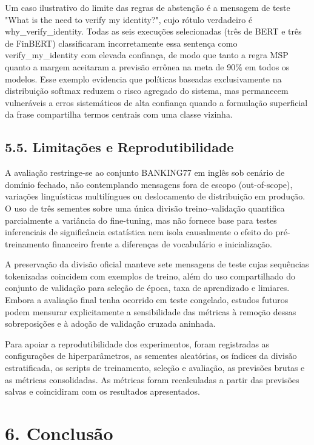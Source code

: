 \documentclass[12pt,a4paper]{article}
\begin{document}
Um caso ilustrativo do limite das regras de abstenção é a mensagem de teste "What is the need to verify my identity?", cujo rótulo verdadeiro é why\_verify\_identity. Todas as seis execuções selecionadas (três de BERT e três de FinBERT) classificaram incorretamente essa sentença como verify\_my\_identity com elevada confiança, de modo que tanto a regra MSP quanto a margem aceitaram a previsão errônea na meta de 90\% em todos os modelos. Esse exemplo evidencia que políticas baseadas exclusivamente na distribuição softmax reduzem o risco agregado do sistema, mas permanecem vulneráveis a erros sistemáticos de alta confiança quando a formulação superficial da frase compartilha termos centrais com uma classe vizinha.

\subsection*{\textbf{5.5. Limitações e Reprodutibilidade}}

A avaliação restringe-se ao conjunto BANKING77 em inglês sob cenário de domínio fechado, não contemplando mensagens fora de escopo (out-of-scope), variações linguísticas multilíngues ou deslocamento de distribuição em produção. O uso de três sementes sobre uma única divisão treino–validação quantifica parcialmente a variância do fine-tuning, mas não fornece base para testes inferenciais de significância estatística nem isola causalmente o efeito do pré-treinamento financeiro frente a diferenças de vocabulário e inicialização.

A preservação da divisão oficial manteve sete mensagens de teste cujas sequências tokenizadas coincidem com exemplos de treino, além do uso compartilhado do conjunto de validação para seleção de época, taxa de aprendizado e limiares. Embora a avaliação final tenha ocorrido em teste congelado, estudos futuros podem mensurar explicitamente a sensibilidade das métricas à remoção dessas sobreposições e à adoção de validação cruzada aninhada.

Para apoiar a reprodutibilidade dos experimentos, foram registradas as configurações de hiperparâmetros, as sementes aleatórias, os índices da divisão estratificada, os scripts de treinamento, seleção e avaliação, as previsões brutas e as métricas consolidadas. As métricas foram recalculadas a partir das previsões salvas e coincidiram com os resultados apresentados.

\section*{\textbf{6. Conclusão}}
\end{document}

